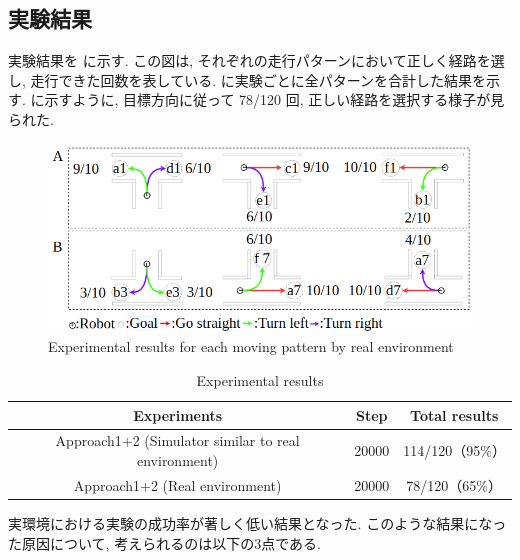 \subsection{実験結果}
実験結果を  に示す. この図は, それぞれの走行パターンにおいて正しく経路を選し, 走行できた回数を表している.  に実験ごとに全パターンを合計した結果を示す.  に示すように, 目標方向に従って 78/120 回, 正しい経路を選択する様子が見られた.

\begin{figure}[hbtp]
  \centering
 \includegraphics[keepaspectratio, scale=0.5]
      {images/real_result.png}
 \caption{Experimental results for each moving pattern by real environment}
 \label{Fig:real_result}
\end{figure}

\begin{table}[hbtp]
  \caption{Experimental results}
  \label{table:real}
  \centering
  \begin{tabular}{|c|c|c|}
    \hline
    Experiments & Step & Total results\\
    \hline
    Approach1+2 (Simulator similar to real environment) & 20000 & 114/120（95\%）\\
    \hline
    Approach1+2 (Real environment) & 20000 & 78/120（65\%）\\
    \hline
  \end{tabular}
\end{table}

実環境における実験の成功率が著しく低い結果となった. このような結果になった原因について, 考えられるのは以下の3点である.


